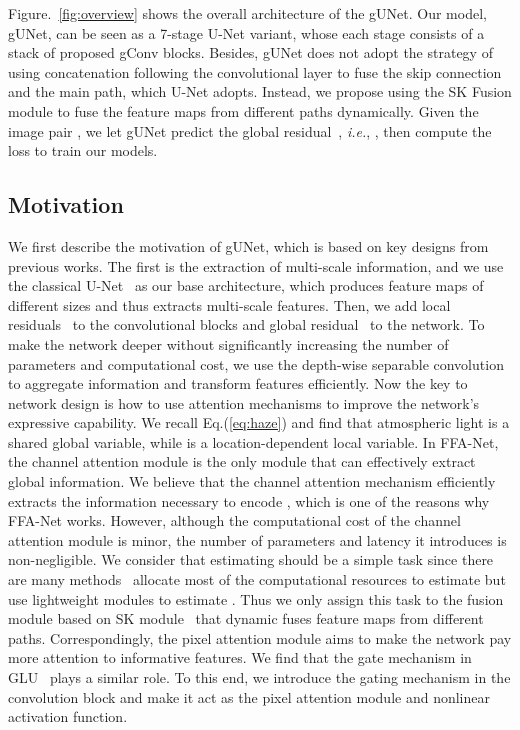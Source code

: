 \documentclass[10pt,twocolumn,letterpaper]{article}
\begin{document}
Figure.~\ref{fig:overview} shows the overall architecture of the gUNet.
Our model, gUNet, can be seen as a 7-stage U-Net variant, whose each stage consists of a stack of proposed gConv blocks.
Besides, gUNet does not adopt the strategy of using concatenation following the convolutional layer to fuse the skip connection and the main path, which U-Net adopts.
Instead, we propose using the SK Fusion module to fuse the feature maps from different paths dynamically.
Given the image pair , we let gUNet predict the global residual~\cite{zhang2017beyond,chen2019gated,qin2020ffa}, \emph{i.e.}, , then compute the  loss to train our models.


\subsection{Motivation}

We first describe the motivation of gUNet, which is based on key designs from previous works.
The first is the extraction of multi-scale information, and we use the classical U-Net~\cite{long2015fully} as our base architecture, which produces feature maps of different sizes and thus extracts multi-scale features.
Then, we add local residuals~\cite{he2016deep} to the convolutional blocks and global residual~\cite{zhang2017beyond} to the network.
To make the network deeper without significantly increasing the number of parameters and computational cost, we use the depth-wise separable convolution~\cite{howard2017mobilenets,sandler2018mobilenetv2} to aggregate information and transform features efficiently.
Now the key to network design is how to use attention mechanisms to improve the network's expressive capability.
We recall Eq.(\ref{eq:haze}) and find that atmospheric light  is a shared global variable, while  is a location-dependent local variable.
In FFA-Net, the channel attention module is the only module that can effectively extract global information.
We believe that the channel attention mechanism efficiently extracts the information necessary to encode , which is one of the reasons why FFA-Net works.
However, although the computational cost of the channel attention module is minor, the number of parameters and latency it introduces is non-negligible.
We consider that estimating  should be a simple task since there are many methods~\cite{he2010single,cai2016dehazenet,ren2016single,zhang2018densely} allocate most of the computational resources to estimate  but use lightweight modules to estimate .
Thus we only assign this task to the fusion module based on SK module~\cite{li2019selective} that dynamic fuses feature maps from different paths.
Correspondingly, the pixel attention module aims to make the network pay more attention to informative features.
We find that the gate mechanism in GLU~\cite{dauphin2017language,shazeer2020glu} plays a similar role.
To this end, we introduce the gating mechanism in the convolution block and make it act as the pixel attention module and nonlinear activation function.
\end{document}
